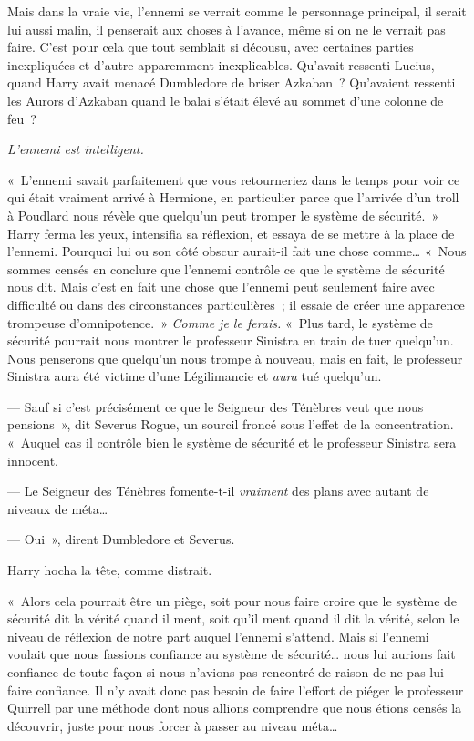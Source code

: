Mais dans la vraie vie, l'ennemi se verrait comme le personnage principal, il serait lui aussi malin, il penserait aux choses à l'avance, même si on ne le verrait pas faire. C'est pour cela que tout semblait si décousu, avec certaines parties inexpliquées et d'autre apparemment inexplicables. Qu'avait ressenti Lucius, quand Harry avait menacé Dumbledore de briser Azkaban~? Qu'avaient ressenti les Aurors d'Azkaban quand le balai s'était élevé au sommet d'une colonne de feu~?

\emph{L'ennemi est intelligent.}

«~L'ennemi savait parfaitement que vous retourneriez dans le temps pour voir ce qui était vraiment arrivé à Hermione, en particulier parce que l'arrivée d'un troll à Poudlard nous révèle que quelqu'un peut tromper le système de sécurité.~» Harry ferma les yeux, intensifia sa réflexion, et essaya de se mettre à la place de l'ennemi. Pourquoi lui ou son côté obscur aurait-il fait une chose comme… «~Nous sommes censés en conclure que l'ennemi contrôle ce que le système de sécurité nous dit. Mais c'est en fait une chose que l'ennemi peut seulement faire avec difficulté ou dans des circonstances particulières~; il essaie de créer une apparence trompeuse d'omnipotence.~» \emph{Comme je le ferais.} «~Plus tard, le système de sécurité pourrait nous montrer le professeur Sinistra en train de tuer quelqu'un. Nous penserons que quelqu'un nous trompe à nouveau, mais en fait, le professeur Sinistra aura été victime d'une Légilimancie et \emph{aura} tué quelqu'un.

--- Sauf si c'est précisément ce que le Seigneur des Ténèbres veut que nous pensions~», dit Severus Rogue, un sourcil froncé sous l'effet de la concentration. «~Auquel cas il contrôle bien le système de sécurité et le professeur Sinistra sera innocent.

--- Le Seigneur des Ténèbres fomente-t-il \emph{vraiment} des plans avec autant de niveaux de méta…

--- Oui~», dirent Dumbledore et Severus.

Harry hocha la tête, comme distrait.

«~Alors cela pourrait être un piège, soit pour nous faire croire que le système de sécurité dit la vérité quand il ment, soit qu'il ment quand il dit la vérité, selon le niveau de réflexion de notre part auquel l'ennemi s'attend. Mais si l'ennemi voulait que nous fassions confiance au système de sécurité… nous lui aurions fait confiance de toute façon si nous n'avions pas rencontré de raison de ne pas lui faire confiance. Il n'y avait donc pas besoin de faire l'effort de piéger le professeur Quirrell par une méthode dont nous allions comprendre que nous étions censés la découvrir, juste pour nous forcer à passer au niveau méta…

